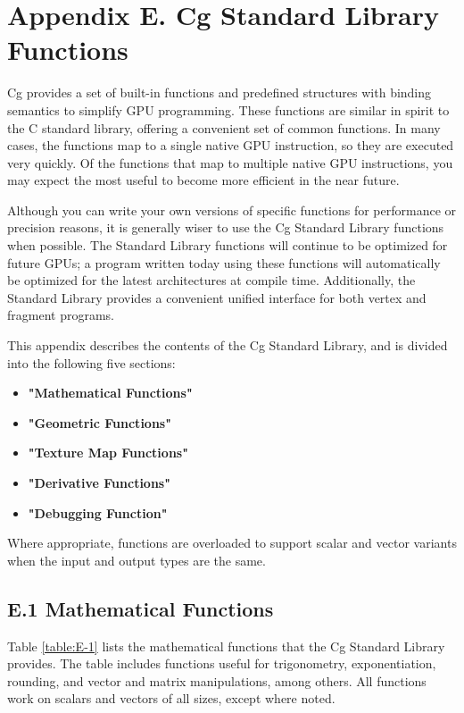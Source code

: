 \documentclass[../main.tex]{subfiles}
\begin{document}
\chapter{Appendix E. Cg Standard Library Functions}

Cg provides a set of built-in functions and predefined structures with binding semantics to simplify GPU programming. These functions are similar in spirit to the C standard library, offering a convenient set of common functions. In many cases, the functions map to a single native GPU instruction, so they are executed very quickly. Of the functions that map to multiple native GPU instructions, you may expect the most useful to become more efficient in the near future.

Although you can write your own versions of specific functions for performance or precision reasons, it is generally wiser to use the Cg Standard Library functions when possible. The Standard Library functions will continue to be optimized for future GPUs; a program written today using these functions will automatically be optimized for the latest architectures at compile time. Additionally, the Standard Library provides a convenient unified interface for both vertex and fragment programs.

This appendix describes the contents of the Cg Standard Library, and is divided into the following five sections:

\begin{itemize}
\item \textbf{"Mathematical Functions"}
\item \textbf{"Geometric Functions"}
\item \textbf{"Texture Map Functions"}
\item \textbf{"Derivative Functions"}
\item \textbf{"Debugging Function"}
\end{itemize}

Where appropriate, functions are overloaded to support scalar and vector variants when the input and output types are the same.

\section{E.1 Mathematical Functions}

Table \ref{table:E-1} lists the mathematical functions that the Cg Standard Library provides. The table includes functions useful for trigonometry, exponentiation, rounding, and vector and matrix manipulations, among others. All functions work on scalars and vectors of all sizes, except where noted.
\end{document}
